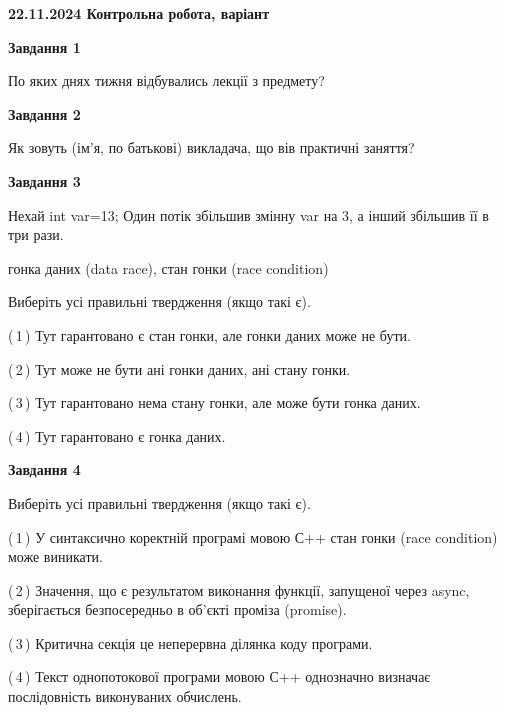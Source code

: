 \documentclass[12pt, ukrainian]{article}
\begin{document}
\begin {large}

\textbf{22.11.2024 Контрольна робота, варіант  }\par


{

\begin{center}
\textbf{Завдання 1}
\end{center}

По яких днях тижня відбувались лекції з предмету?


\begin{center}
\textbf{Завдання 2}
\end{center}

Як зовуть (ім'я, по батькові) викладача, що вів практичні заняття?


\begin{center}
\textbf{Завдання 3}
\end{center}

Нехай int var=13; Один потік збільшив змінну var на 3, а інший збільшив її в три рази.

гонка даних (data race), стан гонки (race condition)

Виберіть усі правильні твердження (якщо такі є).\par
\vspace{2mm}
(\,1\,) Тут гарантовано є стан гонки, але гонки даних може не бути.%

(\,2\,) Тут може не бути ані гонки даних, ані стану гонки.%

(\,3\,) Тут гарантовано нема стану гонки, але може бути гонка даних.%

(\,4\,) Тут гарантовано є гонка даних.%


\begin{center}
\textbf{Завдання 4}
\end{center}

Виберіть усі правильні твердження (якщо такі є).\par
\vspace{2mm}

(\,1\,) У синтаксично коректній програмі мовою С++ стан гонки (race condition) може виникати.%

(\,2\,) Значення, що є результатом виконання функції, запущеної через async, зберігається безпосередньо в об’єкті проміза (promise).%

(\,3\,) Критична секція це неперервна ділянка коду програми.%

(\,4\,) Текст однопотокової програми мовою С++ однозначно визначає послідовність виконуваних обчислень.%


}
\end{large}
\end{document}
